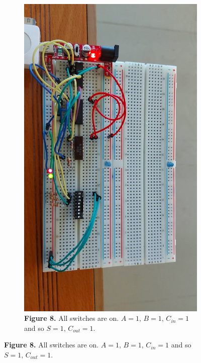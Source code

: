 \documentclass[a4paper]{article}
\begin{document}
\begin{figure}
     \begin{subfigure}[b]{0.9\textwidth}
         \centering
        \includegraphics[angle=90, width=\textwidth]{123on.jpeg}
        \caption*{\textbf{Figure 8.} All switches are on. $A=1,\,B=1,\, C_{in} = 1$ and so $S=1,\,C_{out}=1$.\vspace{2em}}
         \label{fig:1on}
     \end{subfigure}
   \end{figure}
\end{document}
